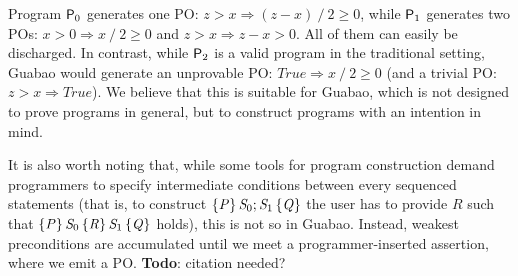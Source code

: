 \documentclass[runningheads]{llncs}
\newcommand{\Conid}[1]{\mathit{#1}}
\newcommand{\Varid}[1]{\mathit{#1}}
\renewcommand{\geq}{\geqslant}
\let\Varid\mathit
\let\Conid\mathit
\newcommand{\todo}[1]{{\bf Todo}: \lbrack #1 \rbrack}
\begin{document}
Program ${\sf P}_0$ generates one PO: \ensuremath{\Varid{z}\mathbin{>}\Varid{x}\mathrel{\Rightarrow}(\Varid{z}\mathbin{-}\Varid{x})\mathbin{/}\mathrm{2}\geq \mathrm{0}}, while ${\sf P}_1$ generates two POs: \ensuremath{\Varid{x}\mathbin{>}\mathrm{0}\mathrel{\Rightarrow}\Varid{x}\mathbin{/}\mathrm{2}\geq \mathrm{0}} and \ensuremath{\Varid{z}\mathbin{>}\Varid{x}\mathrel{\Rightarrow}\Varid{z}\mathbin{-}\Varid{x}\mathbin{>}\mathrm{0}}.
All of them can easily be discharged.
In contrast, while ${\sf P}_2$ is a valid program in the traditional setting, Guabao would generate an unprovable PO: \ensuremath{\Conid{True}\mathrel{\Rightarrow}\Varid{x}\mathbin{/}\mathrm{2}\geq \mathrm{0}} (and a trivial PO: \ensuremath{\Varid{z}\mathbin{>}\Varid{x}\mathrel{\Rightarrow}\Conid{True}}).
We believe that this is suitable for Guabao, which is not designed to prove programs in general, but to construct programs with an intention in mind.

It is also worth noting that, while some tools for program construction demand programmers to specify intermediate conditions between every sequenced statements (that is, to construct \ensuremath{\htriple{\Conid{P}}{\Conid{S}_{0};\Conid{S}_{1}}{\Conid{Q}}} the user has to provide \ensuremath{\Conid{R}} such that \ensuremath{\htripletwo{\Conid{P}}{\Conid{S}_{0}}{\Conid{R}}{\Conid{S}_{1}}{\Conid{Q}}} holds),
this is not so in Guabao. Instead, weakest preconditions are accumulated until we meet a programmer-inserted assertion, where we emit a PO.
\todo{citation needed?}
\end{document}
